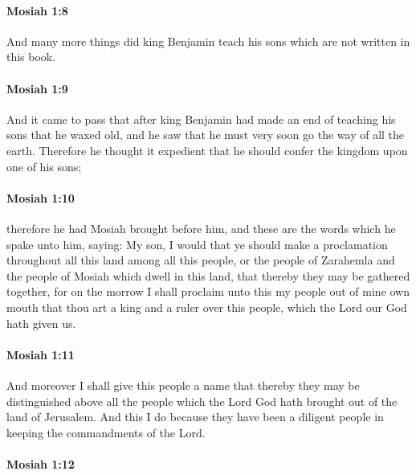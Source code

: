 		\paragraph{Mosiah 1:8} %
			\label{MOSIAH-1-8}

			And many more things did king Benjamin teach his sons
			which are not written in this book.

		\paragraph{Mosiah 1:9} %
			\label{MOSIAH-1-9}

			And it came to pass that
			after king Benjamin had made an end of teaching his sons
			that he waxed old,
			and he saw that he must very soon go the way of all the earth.
			Therefore he thought it expedient
			that he should confer the kingdom upon one of his sons;

		\paragraph{Mosiah 1:10} %
			\label{MOSIAH-1-10}

			therefore he had Mosiah brought before him,
			and these are the words which he spake unto him, saying:
			My son, I would that ye should make a proclamation
			throughout all this land among all this people,
			or the people of Zarahemla and the people of Mosiah which dwell in this land,
			that thereby they may be gathered together,
			for on the morrow I shall proclaim unto this my people out of mine own mouth
			that thou art a king and a ruler over this people,
			which the Lord our God hath given us.

		\paragraph{Mosiah 1:11} %
			\label{MOSIAH-1-11}

			And moreover I shall give this people a name
			that thereby they may be distinguished above all the people
			which the Lord God hath brought out of the land of Jerusalem.
			And this I do because they have been a diligent people
			in keeping the commandments of the Lord.

		\paragraph{Mosiah 1:12} %
			\label{MOSIAH-1-12}

